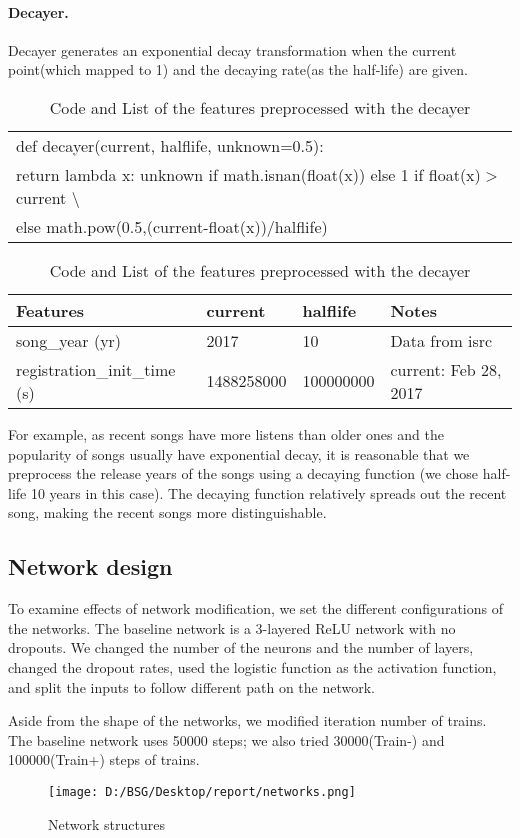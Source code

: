 \documentclass{article}
\begin{document}
\paragraph{Decayer.}
Decayer generates an exponential decay transformation when the current
point(which mapped to 1) and the decaying rate(as the half-life) are given.
\begin{table}[!h]
\centering
\begin{tabular}{|l|} \hline
def decayer(current, halflife, unknown=0.5):\\
\hspace{1cm} return lambda x: unknown if math.isnan(float(x)) else 1 if
float(x)$>$current \textbackslash\\
\hspace{2cm} else math.pow(0.5,(current-float(x))/halflife)
\\\hline
\end{tabular}
\begin{tabular}{|l|l|l|l|}
\hline \rowcolor[HTML]{C0C0C0}
Features & current & halflife & Notes \\\hline
song\_year (yr) & 2017 & 10 & Data from isrc \\\hline
registration\_init\_time (s) & 1488258000 & 100000000 & current: Feb 28, 2017
\\\hline
\end{tabular}
\caption{Code and List of the features preprocessed with the decayer}
\label{table:features}
\end{table}

For example, as recent songs have more listens than older ones and the
popularity of songs usually have exponential decay, it is reasonable that we
preprocess the release years of the songs using a decaying function (we chose
half-life 10 years in this case). The decaying function relatively spreads out
the recent song, making the recent songs more distinguishable.

\subsection{Network design}
To examine effects of network modification, we set the different configurations
of the networks. The baseline network is a 3-layered ReLU network with no
dropouts. We changed the number of the neurons and the number of layers, changed
the dropout rates, used the logistic function as the activation function, and
split the inputs to follow different path on the network.

Aside from the shape of the networks, we modified iteration number of trains.
The baseline network uses 50000 steps; we also tried 30000(Train-) and 100000(Train+) steps of trains.
\newpage
\begin{figure}[!h]
  \centering
  \texttt{[image: D:/BSG/Desktop/report/networks.png]}
  \caption{Network structures}
  \label{fig:nn}
\end{figure}
\end{document}
